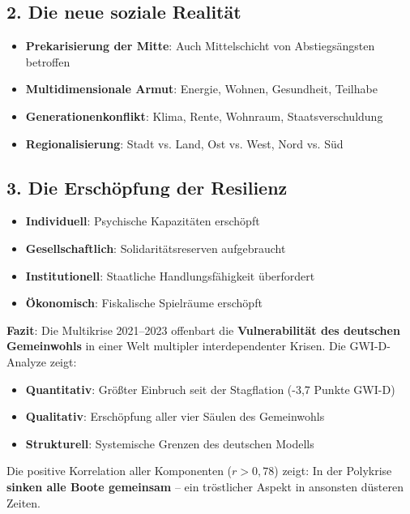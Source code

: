 \subsection{2. Die neue soziale Realität}

\begin{itemize}
    \item \textbf{Prekarisierung der Mitte}: Auch Mittelschicht von Abstiegsängsten betroffen
    \item \textbf{Multidimensionale Armut}: Energie, Wohnen, Gesundheit, Teilhabe
    \item \textbf{Generationenkonflikt}: Klima, Rente, Wohnraum, Staatsverschuldung
    \item \textbf{Regionalisierung}: Stadt vs. Land, Ost vs. West, Nord vs. Süd
\end{itemize}

\subsection{3. Die Erschöpfung der Resilienz}

\begin{itemize}
    \item \textbf{Individuell}: Psychische Kapazitäten erschöpft
    \item \textbf{Gesellschaftlich}: Solidaritätsreserven aufgebraucht
    \item \textbf{Institutionell}: Staatliche Handlungsfähigkeit überfordert
    \item \textbf{Ökonomisch}: Fiskalische Spielräume erschöpft
\end{itemize}

\textbf{Fazit}: Die Multikrise 2021–2023 offenbart die \textbf{Vulnerabilität des deutschen Gemeinwohls} in einer Welt multipler interdependenter Krisen. Die GWI-D-Analyze zeigt:

\begin{itemize}
    \item \textbf{Quantitativ}: Größter Einbruch seit der Stagflation (-3,7 Punkte GWI-D)
    \item \textbf{Qualitativ}: Erschöpfung aller vier Säulen des Gemeinwohls
    \item \textbf{Strukturell}: Systemische Grenzen des deutschen Modells
\end{itemize}

Die positive Korrelation aller Komponenten (\(r > 0,78\)) zeigt: In der Polykrise \textbf{sinken alle Boote gemeinsam} – ein tröstlicher Aspekt in ansonsten düsteren Zeiten.


